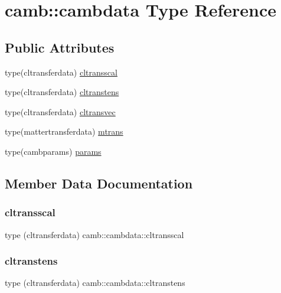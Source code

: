 \hypertarget{structcamb_1_1cambdata}{}\section{camb\+:\+:cambdata Type Reference}
\label{structcamb_1_1cambdata}
\subsection*{Public Attributes}
\begin{DoxyCompactItemize}
\item 
type(cltransferdata) \mbox{\hyperlink{structcamb_1_1cambdata_a8f6585ec6edac9993404a4f526b25b94}{cltransscal}}
\item 
type(cltransferdata) \mbox{\hyperlink{structcamb_1_1cambdata_a69cc2a2779ecae0ed9a1f2265fca528c}{cltranstens}}
\item 
type(cltransferdata) \mbox{\hyperlink{structcamb_1_1cambdata_a52fab84f366067092bb6d96934a599dd}{cltransvec}}
\item 
type(mattertransferdata) \mbox{\hyperlink{structcamb_1_1cambdata_a5c1bba217f24f554c27ad2300f5c4c63}{mtrans}}
\item 
type(cambparams) \mbox{\hyperlink{structcamb_1_1cambdata_ad6a0cc3fa15eae90c1762ea681d1112f}{params}}
\end{DoxyCompactItemize}


\subsection{Member Data Documentation}
\mbox{\label{structcamb_1_1cambdata_a8f6585ec6edac9993404a4f526b25b94}} 
\subsubsection{\texorpdfstring{cltransscal}{cltransscal}}
{\footnotesize\ttfamily type (cltransferdata) camb\+::cambdata\+::cltransscal}

\mbox{\label{structcamb_1_1cambdata_a69cc2a2779ecae0ed9a1f2265fca528c}} 
\subsubsection{\texorpdfstring{cltranstens}{cltranstens}}
{\footnotesize\ttfamily type (cltransferdata) camb\+::cambdata\+::cltranstens}

